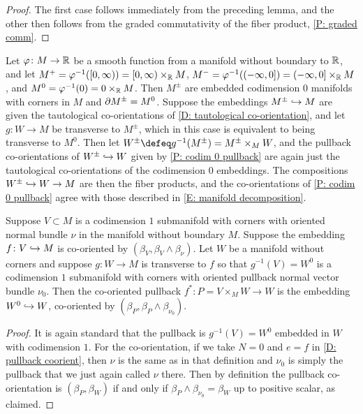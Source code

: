 \begin{proof}
	The first case follows immediately from the preceding lemma, and the other then follows from the graded commutativity of the fiber product, \cref{P: graded comm}.
\end{proof}

\begin{example}
	Let $\varphi \colon M \to \mathbb{R}$ be a smooth function from a manifold without boundary to $\mathbb{R}$, and let $M^+ = \varphi^{-1}([0,\infty)) = [0,\infty) \times_{\mathbb{R}} M$, $M^- = \varphi^{-1}((-\infty,0]) = (-\infty,0] \times_{\mathbb{R}} M$, and $M^0 = \varphi^{-1}(0) = 0 \times_{\mathbb{R}} M$.
	Then $M^\pm$ are embedded codimension $0$ manifolds with corners in $M$ and $\partial M^\pm = M^0$.
	Suppose the embeddings $M^\pm \hookrightarrow M$ are given the tautological co-orientations of \cref{D: tautological co-orientation}, and let $g \colon W \to M$ be transverse to $M^\pm$, which in this case is equivalent to being transverse to $M^0$.
	Then let $W^\pm \defeq g^{-1}(M^\pm) = M^\pm \times_M W$, and the pullback co-orientations of $W^\pm \hookrightarrow W$ given by \cref{P: codim 0 pullback} are again just the tautological co-orientations of the codimension $0$ embeddings.
	The compositions $W^\pm \hookrightarrow W \to M$ are then the fiber products, and the co-orientations of \cref{P: codim 0 pullback} agree with those described in \cref{E: manifold decomposition}.
\end{example}

\begin{proposition}\label{P: codim 1 co-orient}
	Suppose $V \subset M$ is a codimension $1$ submanifold with corners with oriented normal bundle $\nu$ in the manifold without boundary $M$.
	Suppose the embedding $f \colon V \hookrightarrow M$ is co-oriented by $(\beta_V, \beta_V \wedge \beta_\nu)$.
	Let $W$ be a manifold without corners and suppose $g \colon W \to M$ is transverse to $f$ so that $g^{-1}(V) = W^0$ is a codimension $1$ submanifold with corners with oriented pullback normal vector bundle $\nu_0$.
	Then the co-oriented pullback $f^* \colon P = V \times_M W \to W$ is the embedding $W^0 \hookrightarrow W$, co-oriented by $(\beta_P, \beta_P \wedge \beta_{\nu_0})$.
\end{proposition}

\begin{proof}
	It is again standard that the pullback is $g^{-1}(V) = W^0$ embedded in $W$ with codimension $1$.
	For the co-orientation, if we take $N = 0$ and $e = f$ in \cref{D: pullback coorient}, then $\nu$ is the same as in that definition and $\nu_0$ is simply the pullback that we just again called $\nu$ there.
	Then by definition the pullback co-orientation is $(\beta_P, \beta_W)$ if and only if $\beta_P \wedge \beta_{\nu_0} = \beta_W$ up to positive scalar, as claimed.
\end{proof}

